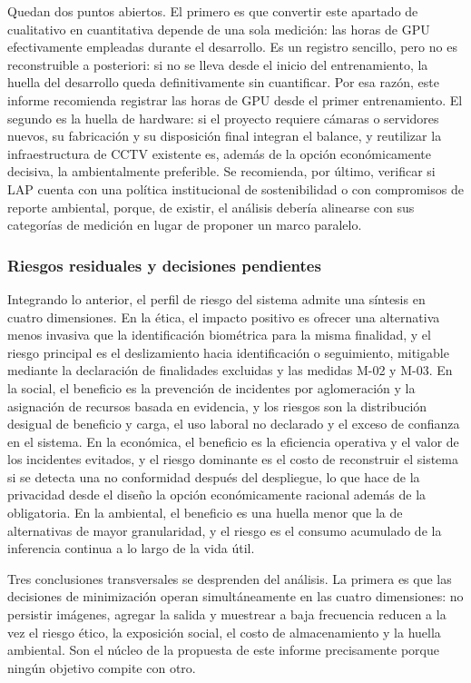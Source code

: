 Quedan dos puntos abiertos. El primero es que convertir este apartado de
cualitativo en cuantitativa depende de una sola medición: las horas de
GPU efectivamente empleadas durante el desarrollo. Es un registro
sencillo, pero no es reconstruible a posteriori: si no se lleva desde el
inicio del entrenamiento, la huella del desarrollo queda definitivamente
sin cuantificar. Por esa razón, este informe recomienda registrar las
horas de GPU desde el primer entrenamiento. El segundo es la huella de
hardware: si el proyecto requiere cámaras o servidores nuevos, su
fabricación y su disposición final integran el balance, y reutilizar la
infraestructura de CCTV existente es, además de la opción económicamente
decisiva, la ambientalmente preferible. Se recomienda, por último,
verificar si LAP cuenta con una política institucional de sostenibilidad
o con compromisos de reporte ambiental, porque, de existir, el análisis
debería alinearse con sus categorías de medición en lugar de proponer un
marco paralelo.

\subsubsection{Riesgos residuales y decisiones pendientes}

Integrando lo anterior, el perfil de riesgo del sistema admite una
síntesis en cuatro dimensiones. En la ética, el impacto positivo es
ofrecer una alternativa menos invasiva que la identificación biométrica
para la misma finalidad, y el riesgo principal es el deslizamiento hacia
identificación o seguimiento, mitigable mediante la declaración de
finalidades excluidas y las medidas M-02 y M-03. En la social, el
beneficio es la prevención de incidentes por aglomeración y la
asignación de recursos basada en evidencia, y los riesgos son la
distribución desigual de beneficio y carga, el uso laboral no declarado
y el exceso de confianza en el sistema. En la económica, el beneficio es
la eficiencia operativa y el valor de los incidentes evitados, y el
riesgo dominante es el costo de reconstruir el sistema si se detecta una
no conformidad después del despliegue, lo que hace de la privacidad
desde el diseño la opción económicamente racional además de la
obligatoria. En la ambiental, el beneficio es una huella menor que la de
alternativas de mayor granularidad, y el riesgo es el consumo acumulado
de la inferencia continua a lo largo de la vida útil.

Tres conclusiones transversales se desprenden del análisis. La primera
es que las decisiones de minimización operan simultáneamente en las
cuatro dimensiones: no persistir imágenes, agregar la salida y muestrear
a baja frecuencia reducen a la vez el riesgo ético, la exposición
social, el costo de almacenamiento y la huella ambiental. Son el núcleo
de la propuesta de este informe precisamente porque ningún objetivo
compite con otro.


